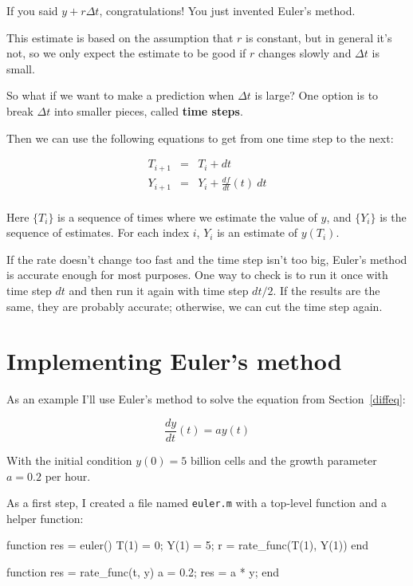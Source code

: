 \documentclass[
]{book}
\numberwithin{Answer}{chapter}
\numberwithin{Exercise}{chapter}
\begin{document}
If you said $y + r \Delta t$, congratulations!  You just invented
Euler's method.


This estimate is based on the assumption that $r$ is constant, but
in general it's not, so we only expect the estimate to be good if
$r$ changes slowly and $\Delta t$ is small.

So what if we want to make a prediction when $\Delta t$ is large?
One option is to break $\Delta t$ into smaller pieces, called
{\bf time steps}.

Then we can use the following equations to get from one time step to the next:

\begin{eqnarray}
\label{eq:euler2}
T_{i+1} &=& T_i + dt                       \\
Y_{i+1} &=& Y_i + \frac{df}{dt}(t)~dt           \\
\end{eqnarray}

Here $\{T_i\}$ is a sequence of times where we estimate the value
of $y$, and $\{Y_i\}$ is the sequence of estimates.  For each
index $i$, $Y_i$ is an estimate of $y(T_i)$.

If the rate doesn't change too fast and the time step isn't
too big, Euler's method is accurate enough for most purposes.  One
way to check is to run it once with time step $dt$ and then run it
again with time step $dt/2$.  If the results are the same, they are
probably accurate; otherwise, we can cut the time step again.


\section{Implementing Euler's method}

As an example I'll use Euler's method to solve the equation from Section~\ref{diffeq}:

\[ \frac{dy}{dt}(t) = a y(t) \]

With the initial condition $y(0) = 5$ billion cells and
the growth parameter $a = 0.2$ per hour. 

As a first step, I created a file named {\tt euler.m} with a top-level function and a helper function:

\begin{code}
function res = euler()
    T(1) = 0;
    Y(1) = 5;
    r = rate_func(T(1), Y(1))
end

function res = rate_func(t, y)
   a = 0.2;
   res = a * y;
end
\end{code}
\end{document}

